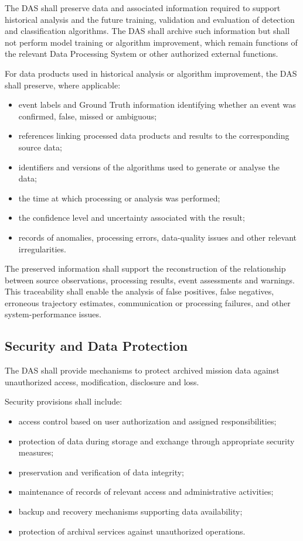 The DAS shall preserve data and associated information required to support historical analysis and the future training, validation and evaluation of detection and classification algorithms. The DAS shall archive such information but shall not perform model training or algorithm improvement, which remain functions of the relevant Data Processing System or other authorized external functions.

For data products used in historical analysis or algorithm improvement, the DAS shall preserve, where applicable:

\begin{itemize}
    \item event labels and Ground Truth information identifying whether an event was confirmed, false, missed or ambiguous;
    \item references linking processed data products and results to the corresponding source data;
    \item identifiers and versions of the algorithms used to generate or analyse the data;
    \item the time at which processing or analysis was performed;
    \item the confidence level and uncertainty associated with the result;
    \item records of anomalies, processing errors, data-quality issues and other relevant irregularities.
\end{itemize}

The preserved information shall support the reconstruction of the relationship between source observations, processing results, event assessments and warnings. This traceability shall enable the analysis of false positives, false negatives, erroneous trajectory estimates, communication or processing failures, and other system-performance issues.

\subsection{Security and Data Protection}

The DAS shall provide mechanisms to protect archived mission data against unauthorized access, modification, disclosure and loss.

Security provisions shall include:

\begin{itemize}
    \item access control based on user authorization and assigned responsibilities;
    \item protection of data during storage and exchange through appropriate security measures;
    \item preservation and verification of data integrity;
    \item maintenance of records of relevant access and administrative activities;
    \item backup and recovery mechanisms supporting data availability;
    \item protection of archival services against unauthorized operations.
\end{itemize}

